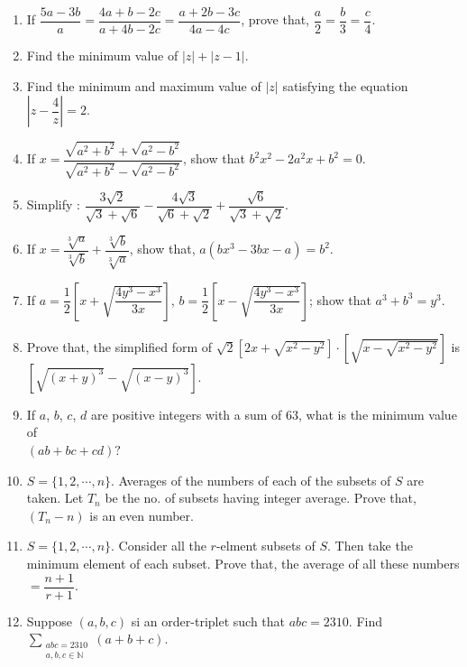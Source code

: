 \documentclass[11pt, a4paper]{article}
\begin{document}
\begin{enumerate}
	\item If $\dfrac{5a-3b}{a} = \dfrac{4a+b-2c}{a+4b-2c} = \dfrac{a+2b-3c}{4a-4c}$, prove that, $\dfrac{a}{2} = \dfrac{b}{3} = \dfrac{c}{4}$.
	
	\item Find the minimum value of $|z| + |z-1|$.
	
	\item Find the minimum and maximum value of $|z|$ satisfying the equation $\left| z - \dfrac{4}{z} \right|= 2$.
	
	\item If $x = \dfrac{\sqrt{a^2 + b^2} + \sqrt{a^2 - b^2}}{\sqrt{a^2 + b^2} - \sqrt{a^2 - b^2}}$, show that $b^2x^2 - 2a^2x+b^2 = 0$.
	
	\item Simplify : $\dfrac{3\sqrt{2}}{\sqrt{3} + \sqrt{6}} - \dfrac{4\sqrt{3}}{\sqrt{6} + \sqrt{2}} + \dfrac{\sqrt{6}}{\sqrt{3} + \sqrt{2}}$.
	
	\item If $x = \dfrac{\sqrt[3]{a}}{\sqrt[3]{b}} + \dfrac{\sqrt[3]{b}}{\sqrt[3]{a}}$, show that, $a(bx^3 - 3bx -a) = b^2$.
	
	\item If $a = \dfrac{1}{2} \left[ x + \sqrt{\dfrac{4y^3 - x^3}{3x}} \right]$, $b = \dfrac{1}{2} \left[ x - \sqrt{\dfrac{4y^3 - x^3}{3x}} \right]$; show that $a^3 + b^3 = y^3$.
	
	\item Prove that, the simplified form of $\sqrt{2} \left[ 2x + \sqrt{x^2 - y^2} \right] \cdot \left[ \sqrt{x - \sqrt{x^2 - y^2}} \right]$ is $\left[ \sqrt{(x+y)^3} - \sqrt{(x-y)^3} \right]$.
	
	\item If $a$, $b$, $c$, $d$ are positive integers with a sum of $63$, what is the minimum value of \\ $(ab+bc+cd) ?$
	
	\item $S = \{1, 2, \cdots , n\}$. Averages of the numbers of each of the subsets of $S$ are taken. Let $T_n$ be the no. of subsets having integer average. Prove that, $(T_n - n)$ is an even number.
	
	\item $S = \{1, 2, \cdots , n\}$. Consider all the $r$-elment subsets of $S$. Then take the minimum element of each subset. Prove that, the average of all these numbers $= \dfrac{n+1}{r+1}$.
	
	\item Suppose $(a, b, c)$ si an order-triplet such that $abc = 2310$. Find $\sum \limits_{\substack{abc = 2310 \\ a, b, c \in \mathbb{N}}} (a+b+c)$.
	

\end{enumerate}
\end{document}
